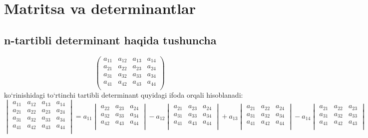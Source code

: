 \chapter{Matritsa va determinantlar}
\section{n-tartibli determinant haqida tushuncha}
$$
\begin{pmatrix}
	a_{11}&a_{12}&a_{13}&a_{14}\\
	a_{21}&a_{22}&a_{23}&a_{24}\\
	a_{31}&a_{32}&a_{33}&a_{34}\\
	a_{41}&a_{42}&a_{43}&a_{44}\\
\end{pmatrix}
$$ ko`rinishidagi to`rtinchi tartibli determinant quyidagi ifoda orqali hisoblanadi:
\begin{equation}
	\begin{vmatrix}
		a_{11}&a_{12}&a_{13}&a_{14}\\
		a_{21}&a_{22}&a_{23}&a_{24}\\
		a_{31}&a_{32}&a_{33}&a_{34}\\
		a_{41}&a_{42}&a_{43}&a_{44}\\
	\end{vmatrix}=a_{11}
\begin{vmatrix}
	a_{22}&a_{23}&a_{24}\\
	a_{32}&a_{33}&a_{34}\\
	a_{42}&a_{43}&a_{44}\\
\end{vmatrix}-a_{12}
\begin{vmatrix}
	a_{21}&a_{23}&a_{24}\\
	a_{31}&a_{33}&a_{34}\\
	a_{41}&a_{43}&a_{44}\\
\end{vmatrix}+a_{13}
\begin{vmatrix}
	a_{21}&a_{22}&a_{24}\\
	a_{31}&a_{32}&a_{34}\\
	a_{41}&a_{42}&a_{44}\\
\end{vmatrix}-a_{14}
\begin{vmatrix}
	a_{21}&a_{22}&a_{23}\\
	a_{31}&a_{32}&a_{33}\\
	a_{41}&a_{42}&a_{43}\\
\end{vmatrix}	
\label{4.1}	
\end{equation}

